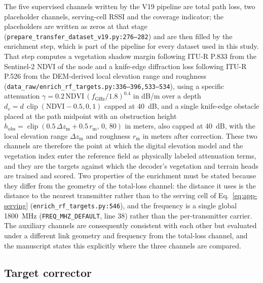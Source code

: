 The five supervised channels written by the V19 pipeline are total path
loss, two placeholder channels, serving-cell RSSI and the coverage
indicator; the placeholders are written as zeros at that stage
(\texttt{prepare\_\allowbreak{}transfer\_\allowbreak{}dataset\_\allowbreak{}v19.py:\allowbreak{}276--282}) and are then filled
by the enrichment step, which is part of the pipeline for every dataset
used in this study. That step computes a vegetation shadow margin
following ITU-R P.833 from the Sentinel-2 NDVI of the node and a
knife-edge diffraction loss following ITU-R P.526 from the DEM-derived
local elevation range and roughness
(\texttt{data\_\allowbreak{}raw/\allowbreak{}enrich\_\allowbreak{}rf\_\allowbreak{}targets\allowbreak{}.py:\allowbreak{}336--396,533--534}), using a
specific attenuation $\gamma = 0.2\,\mathrm{NDVI}\,(f_{\mathrm{GHz}}/1.8)^{0.4}$
in dB/m over a depth $d_{v} = d\,\operatorname{clip}(\mathrm{NDVI}-0.5,0,1)$
capped at 40~dB, and a single knife-edge obstacle placed at the path
midpoint with an obstruction height
$h_{\mathrm{obs}} = \operatorname{clip}(0.5\,\Delta z_{\mathrm{m}} + 0.5\,r_{\mathrm{m}},\,0,\,80)$
in meters, also capped at 40~dB, with the local elevation range $\Delta z_{\mathrm{m}}$ and roughness $r_{\mathrm{m}}$ in meters after
correction. These two channels are therefore the point
at which the digital elevation model and the vegetation index enter the
reference field as physically labeled attenuation terms, and they are the
targets against which the decoder's vegetation and terrain heads are
trained and scored. Two properties of the enrichment must be stated because
they differ from the geometry of the total-loss channel: the distance it
uses is the distance to the nearest transmitter rather than to the serving
cell of Eq.~\eqref{eq:app-serving}
(\texttt{enrich\_\allowbreak{}rf\_\allowbreak{}targets\allowbreak{}.py:\allowbreak{}546}), and the frequency is a single
global 1800~MHz (\texttt{FREQ\_\allowbreak{}MHZ\_\allowbreak{}DEFAULT}, line 38) rather than the
per-transmitter carrier. The auxiliary channels are consequently
consistent with each other but evaluated under a different link geometry
and frequency from the total-loss channel, and the manuscript states this
explicitly where the three channels are compared.

\subsection{Target corrector}
\label{app:corrector}

